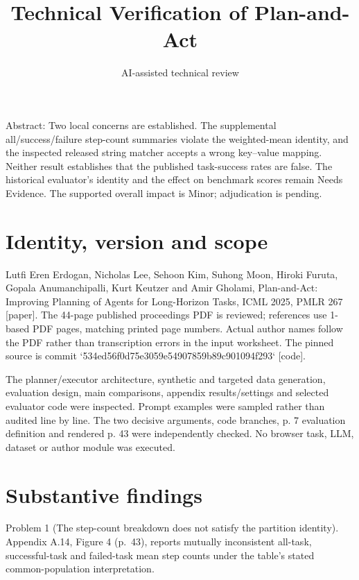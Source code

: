 \documentclass[10pt]{article}
\title{Technical Verification of Plan-and-Act}
\author{AI-assisted technical review}
\date{}
\begin{document}
\maketitle
Abstract: Two local concerns are established. The supplemental all/success/failure step-count summaries violate the weighted-mean identity, and the inspected released string matcher accepts a wrong key–value mapping. Neither result establishes that the published task-success rates are false. The historical evaluator’s identity and the effect on benchmark scores remain Needs Evidence. The supported overall impact is Minor; adjudication is pending.\par
\section*{Identity, version and scope}
Lutfi Eren Erdogan, Nicholas Lee, Sehoon Kim, Suhong Moon, Hiroki Furuta, Gopala Anumanchipalli, Kurt Keutzer and Amir Gholami, Plan-and-Act: Improving Planning of Agents for Long-Horizon Tasks, ICML 2025, PMLR 267 [paper]. The 44-page published proceedings PDF is reviewed; references use 1-based PDF pages, matching printed page numbers. Actual author names follow the PDF rather than transcription errors in the input worksheet. The pinned source is commit `534ed56f0d75e3059e54907859b89c901094f293` [code].\par
The planner/executor architecture, synthetic and targeted data generation, evaluation design, main comparisons, appendix results/settings and selected evaluator code were inspected. Prompt examples were sampled rather than audited line by line. The two decisive arguments, code branches, p. 7 evaluation definition and rendered p. 43 were independently checked. No browser task, LLM, dataset or author module was executed.\par
\section*{Substantive findings}
Problem 1 (The step-count breakdown does not satisfy the partition identity).  Appendix A.14, Figure 4 (p. 43), reports mutually inconsistent all-task, successful-task and failed-task mean step counts under the table’s stated common-population interpretation.\par
\end{document}

